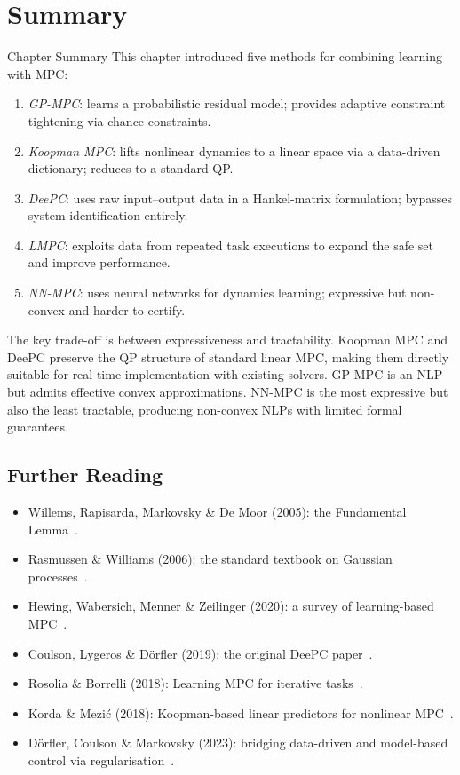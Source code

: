 \section{Summary}
\label{sec:learning_summary}

\begin{summarybox}{Chapter Summary}
	This chapter introduced five methods for combining learning with MPC:
	\begin{enumerate}
		\item \emph{GP-MPC}: learns a probabilistic residual model; provides adaptive constraint tightening via chance constraints.
		\item \emph{Koopman MPC}: lifts nonlinear dynamics to a linear space via a data-driven dictionary; reduces to a standard QP.
		\item \emph{DeePC}: uses raw input--output data in a Hankel-matrix formulation; bypasses system identification entirely.
		\item \emph{LMPC}: exploits data from repeated task executions to expand the safe set and improve performance.
		\item \emph{NN-MPC}: uses neural networks for dynamics learning; expressive but non-convex and harder to certify.
	\end{enumerate}
	The key trade-off is between expressiveness and tractability. Koopman MPC and DeePC preserve the QP structure of standard linear MPC, making them directly suitable for real-time implementation with existing solvers. GP-MPC is an NLP but admits effective convex approximations. NN-MPC is the most expressive but also the least tractable, producing non-convex NLPs with limited formal guarantees.
\end{summarybox}

\subsection*{Further Reading}

\begin{itemize}[noitemsep]
	\item Willems, Rapisarda, Markovsky \& De Moor (2005): the Fundamental Lemma~\cite{Willems2005}.
	\item Rasmussen \& Williams (2006): the standard textbook on Gaussian processes~\cite{Rasmussen2006}.
	\item Hewing, Wabersich, Menner \& Zeilinger (2020): a survey of learning-based MPC~\cite{Hewing2020}.
	\item Coulson, Lygeros \& D\"orfler (2019): the original DeePC paper~\cite{Coulson2019}.
	\item Rosolia \& Borrelli (2018): Learning MPC for iterative tasks~\cite{Rosolia2018}.
	\item Korda \& Mezi\'c (2018): Koopman-based linear predictors for nonlinear MPC~\cite{Korda2018}.
	\item D\"orfler, Coulson \& Markovsky (2023): bridging data-driven and model-based control via regularisation~\cite{Dorfler2023}.
\end{itemize}


